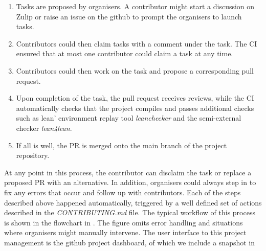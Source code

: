 \begin{enumerate}
    \item Tasks are proposed by organisers. A contributor might start a discussion on Zulip or raise an issue on the github to prompt the organisers to launch tasks.
    \item Contributors could then claim tasks with a comment under the task. The CI ensured that at most one contributor could claim a task at any time.
    \item Contributors could then work on the task and propose a corresponding pull request.
    \item Upon completion of the task, the pull request receives reviews, while the CI automatically checks that the project compiles and passes additional checks such as lean' environment replay tool \emph{leanchecker} and the semi-external checker \emph{lean4lean}\cite{lean4lean}.
    \item If all is well, the PR is merged onto the main branch of the project repository.
\end{enumerate}

At any point in this process, the contributor can disclaim the task or replace a proposed PR with an alternative. In addition, organisers could always step in to fix any errors that occur and follow up with contributors. Each of the steps described above happened automatically, triggered by a well defined set of actions described in the \emph{CONTRIBUTING.md} file. The typical workflow of this process is shown in the flowchart in . The figure omits error handling and situations where organisers might manually intervene. The user interface to this project management is the github project dashboard, of which we include a snapshot in 

